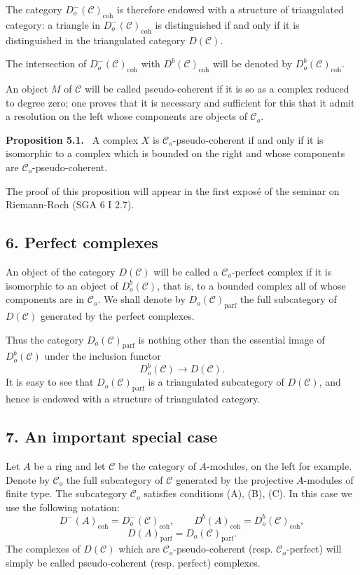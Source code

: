 \documentclass[11pt]{article}
\newenvironment{statement}[1]{\par\medskip\noindent\textbf{#1.}\ }{\par\medskip}
\providecommand{\parf}{\mathrm{parf}}
\providecommand{\coh}{\mathrm{coh}}
\providecommand{\cC}{\mathcal C}
\providecommand{\cC}{\mathcal C}
\providecommand{\parf}{\mathrm{parf}}
\providecommand{\coh}{\mathrm{coh}}
\begin{document}
The category $D_o^-(\cC)_{\coh}$ is therefore endowed with a structure of triangulated category: a triangle in $D_o^-(\cC)_{\coh}$ is distinguished if and only if it is distinguished in the triangulated category $D(\cC)$.

The intersection of $D_o^-(\cC)_{\coh}$ with $D^b(\cC)_{\coh}$ will be denoted by $D_o^b(\cC)_{\coh}$.

An object $M$ of $\cC$ will be called pseudo-coherent if it is so as a complex reduced to degree zero; one proves that it is necessary and sufficient for this that it admit a resolution on the left whose components are objects of $\cC_o$.

\label{sga5:VIII:proposition:5.1}\begin{statement}{Proposition 5.1}
A complex $X$ is $\cC_o$-pseudo-coherent if and only if it is isomorphic to a complex which is bounded on the right and whose components are $\cC_o$-pseudo-coherent.
\end{statement}

The proof of this proposition will appear in the first exposé of the seminar on Riemann-Roch (SGA 6 I 2.7).

\subsection*{6. Perfect complexes}\label{sga5:VIII:subsection:6}

An object of the category $D(\cC)$ will be called a $\cC_o$-perfect complex if it is isomorphic to an object of $D_o^b(\cC)$, that is, to a bounded complex all of whose components are in $\cC_o$. We shall denote by $D_o(\cC)_{\parf}$ the full subcategory of $D(\cC)$ generated by the perfect complexes.

Thus the category $D_o(\cC)_{\parf}$ is nothing other than the essential image of $D_o^b(\cC)$ under the inclusion functor
\[
D_o^b(\cC)\longrightarrow D(\cC).
\]
It is easy to see that $D_o(\cC)_{\parf}$ is a triangulated subcategory of $D(\cC)$, and hence is endowed with a structure of triangulated category.

\subsection*{7. An important special case}\label{sga5:VIII:subsection:7}

Let $A$ be a ring and let $\cC$ be the category of $A$-modules, on the left for example. Denote by $\cC_o$ the full subcategory of $\cC$ generated by the projective $A$-modules of finite type. The subcategory $\cC_o$ satisfies conditions (A), (B), (C). In this case we use the following notation:
\[
D^-(A)_{\coh}=D_o^-(\cC)_{\coh},\qquad
D^b(A)_{\coh}=D_o^b(\cC)_{\coh},
\]
\[
D(A)_{\parf}=D_o(\cC)_{\parf}.
\]
The complexes of $D(\cC)$ which are $\cC_o$-pseudo-coherent (resp. $\cC_o$-perfect) will simply be called pseudo-coherent (resp. perfect) complexes.
\end{document}
